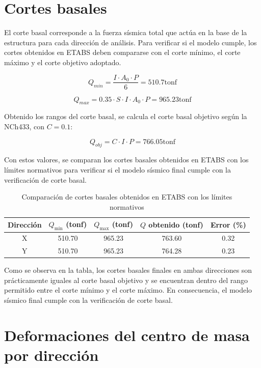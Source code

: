 \section{Cortes basales}

El corte basal corresponde a la fuerza sísmica total que actúa en la base de la estructura para cada dirección de análisis. Para verificar si el modelo cumple, los cortes obtenidos en ETABS deben compararse con el corte mínimo, el corte máximo y el corte objetivo adoptado.

\begin{equation}
Q_{min} = \frac{I \cdot A_0 \cdot P}{6} = 510.7 \text{tonf}
\end{equation}

\begin{equation}
Q_{max} = 0.35 \cdot S \cdot I \cdot A_0 \cdot P = 965.23 \text{tonf}
\end{equation}

Obtenido los rangos del corte basal, se calcula el corte basal objetivo según la NCh433\cite{NCh433:1996}, con $C=0.1$:

\begin{equation}
Q_{obj} = C \cdot I \cdot P = 766.05 \text{tonf}
\end{equation}

Con estos valores, se comparan los cortes basales obtenidos en ETABS con los límites normativos para verificar si el modelo sísmico final cumple con la verificación de corte basal.

\begin{table}[H]
\centering
\caption{Comparación de cortes basales obtenidos en ETABS con los límites normativos}
\begin{tabular}{ccccc}
\toprule
Dirección & $Q_{\min}$ (tonf) & $Q_{\max}$ (tonf) & $Q$ obtenido (tonf) & Error (\%) \\
\midrule
X & 510.70 & 965.23 & 763.60 & 0.32 \\
Y & 510.70 & 965.23 & 764.28 & 0.23 \\
\bottomrule
\end{tabular}
\end{table}

Como se observa en la tabla, los cortes basales finales en ambas direcciones son prácticamente iguales al corte basal objetivo y se encuentran dentro del rango permitido entre el corte mínimo y el corte máximo. En consecuencia, el modelo sísmico final cumple con la verificación de corte basal.

\section{Deformaciones del centro de masa por dirección}

